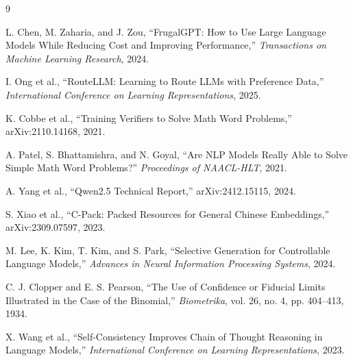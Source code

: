 \documentclass[preprint]{kcc}
\begin{document}
\balance
\begin{thebibliography}{9}

L. Chen, M. Zaharia, and J. Zou,
``FrugalGPT: How to Use Large Language Models While Reducing Cost and Improving Performance,''
\textit{Transactions on Machine Learning Research}, 2024.

I. Ong et al.,
``RouteLLM: Learning to Route LLMs with Preference Data,''
\textit{International Conference on Learning Representations}, 2025.

K. Cobbe et al.,
``Training Verifiers to Solve Math Word Problems,''
arXiv:2110.14168, 2021.

A. Patel, S. Bhattamishra, and N. Goyal,
``Are NLP Models Really Able to Solve Simple Math Word Problems?''
\textit{Proceedings of NAACL-HLT}, 2021.

A. Yang et al.,
``Qwen2.5 Technical Report,''
arXiv:2412.15115, 2024.

S. Xiao et al.,
``C-Pack: Packed Resources for General Chinese Embeddings,''
arXiv:2309.07597, 2023.

M. Lee, K. Kim, T. Kim, and S. Park,
``Selective Generation for Controllable Language Models,''
\textit{Advances in Neural Information Processing Systems}, 2024.

C. J. Clopper and E. S. Pearson,
``The Use of Confidence or Fiducial Limits Illustrated in the Case of the Binomial,''
\textit{Biometrika}, vol. 26, no. 4, pp. 404--413, 1934.

X. Wang et al.,
``Self-Consistency Improves Chain of Thought Reasoning in Language Models,''
\textit{International Conference on Learning Representations}, 2023.

\end{thebibliography}
\end{document}
